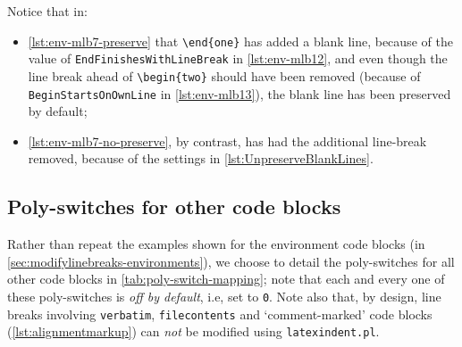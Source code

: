 
	Notice that in: \begin{itemize} \item \cref{lst:env-mlb7-preserve} that \lstinline!\end{one}! has added a blank line, because of the value of \texttt{EndFinishesWithLineBreak} in \vref{lst:env-mlb12}, and even though the line break ahead of \lstinline!\begin{two}! should have been removed (because of \texttt{BeginStartsOnOwnLine} in \vref{lst:env-mlb13}), the blank line has been preserved by default;
		\item \cref{lst:env-mlb7-no-preserve}, by contrast, has had the additional line-break removed, because of the settings in \cref{lst:UnpreserveBlankLines}.
	\end{itemize}

\subsection{Poly-switches for other code blocks}
	Rather than repeat the examples shown for the environment code blocks (in \vref{sec:modifylinebreaks-environments}), we choose to detail the poly-switches for all other code blocks in \cref{tab:poly-switch-mapping}; note that each and every one of these poly-switches is \emph{off by default}, i.e, set to \texttt{0}.
	Note also that, by design, line breaks involving \texttt{verbatim}, \texttt{filecontents} and `comment-marked' code blocks (\vref{lst:alignmentmarkup}) can \emph{not} be modified using \texttt{latexindent.pl}.

